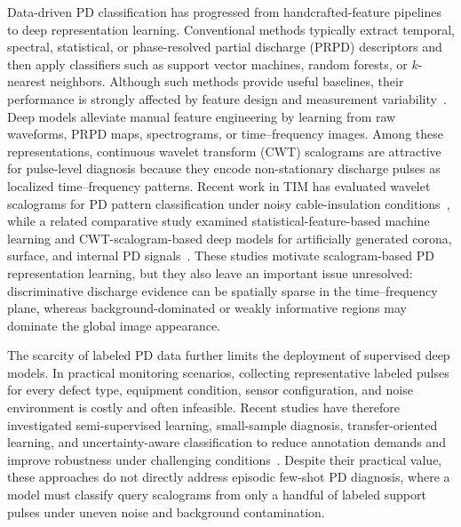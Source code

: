 \documentclass[journal]{IEEEtran}
\newcommand{\1}{\mathbf{1}}
\begin{document}
Data-driven PD classification has progressed from handcrafted-feature pipelines to deep representation learning. Conventional methods typically extract temporal, spectral, statistical, or phase-resolved partial discharge (PRPD) descriptors and then apply classifiers such as support vector machines, random forests, or $k$-nearest neighbors. Although such methods provide useful baselines, their performance is strongly affected by feature design and measurement variability~\cite{Sahoo2024MeasurementPDMLDL}. Deep models alleviate manual feature engineering by learning from raw waveforms, PRPD maps, spectrograms, or time--frequency images. Among these representations, continuous wavelet transform (CWT) scalograms are attractive for pulse-level diagnosis because they encode non-stationary discharge pulses as localized time--frequency patterns. Recent work in TIM has evaluated wavelet scalograms for PD pattern classification under noisy cable-insulation conditions~\cite{Sahoo2024TIMScalogram}, while a related comparative study examined statistical-feature-based machine learning and CWT-scalogram-based deep models for artificially generated corona, surface, and internal PD signals~\cite{Sahoo2024MeasurementPDMLDL}. These studies motivate scalogram-based PD representation learning, but they also leave an important issue unresolved: discriminative discharge evidence can be spatially sparse in the time--frequency plane, whereas background-dominated or weakly informative regions may dominate the global image appearance.

The scarcity of labeled PD data further limits the deployment of supervised deep models. In practical monitoring scenarios, collecting representative labeled pulses for every defect type, equipment condition, sensor configuration, and noise environment is costly and often infeasible. Recent studies have therefore investigated semi-supervised learning, small-sample diagnosis, transfer-oriented learning, and uncertainty-aware classification to reduce annotation demands and improve robustness under challenging conditions~\cite{Tai2024AccessSemiSupervisedPD,Yang2025TIMSemiSupervisedPD,Jing2025MeasurementTRSMM,Sharma2025TIMBayesianPD}. Despite their practical value, these approaches do not directly address episodic few-shot PD diagnosis, where a model must classify query scalograms from only a handful of labeled support pulses under uneven noise and background contamination.
\end{document}
